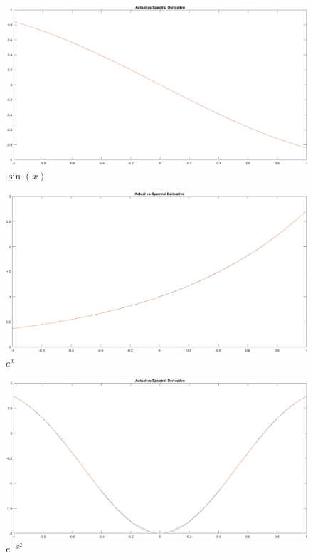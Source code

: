 \documentclass[12pt]{article}
\begin{document}
\begin{figure}[htp]
\centering
\includegraphics[scale=0.10]{8_5sin.PNG}
\caption{$\sin(x)$}
\end{figure}
\begin{figure}[htp]
\centering
\includegraphics[scale=0.10]{8_5exp.PNG}
\caption{$e^x$}
\end{figure}
\begin{figure}[htp]
\centering
\includegraphics[scale=0.10]{8_5expx2.PNG}
\caption{$e^{-x^2}$}
\end{figure}


\newpage

\end{document}
